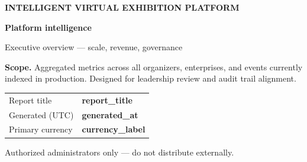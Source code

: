 \documentclass[a4paper,11pt]{article}
\begin{document}
\begin{titlepage}
\thispagestyle{empty}
\vspace*{-8mm}
\noindent{\color{brand}\rule{\linewidth}{5pt}}

\vspace{1.4cm}
{\fontsize{11}{13}\selectfont\textcolor{brand}{\bfseries INTELLIGENT VIRTUAL EXHIBITION PLATFORM}}

\vspace{0.35cm}
{\fontsize{32}{38}\selectfont\textcolor{slate}{\bfseries Platform intelligence}}

\vspace{0.25cm}
{\fontsize{15}{20}\selectfont\textcolor{slatemuted}{Executive overview — scale, revenue, governance}}

\vspace{1.6cm}
\begin{tcolorbox}[
  enhanced, colback=slate, colframe=slate, arc=4pt, boxrule=0pt,
  left=16pt, right=16pt, top=14pt, bottom=14pt, width=0.92\textwidth
]
\color{white}\small
\textbf{Scope.} Aggregated metrics across all organizers, enterprises, and events currently
indexed in production. Designed for leadership review and audit trail alignment.
\end{tcolorbox}

\vfill
\begin{tabularx}{0.92\textwidth}{@{}l X@{}}
\footnotesize\textcolor{muted}{Report title} &
\footnotesize\textbf{\textcolor{slate}{ {{ report_title }} }} \\[0.6em]
\footnotesize\textcolor{muted}{Generated (UTC)} &
\footnotesize\textbf{\textcolor{slate}{ {{ generated_at }} }} \\[0.6em]
\footnotesize\textcolor{muted}{Primary currency} &
\footnotesize\textbf{\textcolor{slate}{ {{ currency_label }} }} \\
\end{tabularx}

\vspace{1.2cm}
{\footnotesize\textcolor{muted}{Authorized administrators only — do not distribute externally.}}
\end{titlepage}

\newpage
\tableofcontents
\newpage

\end{document}
